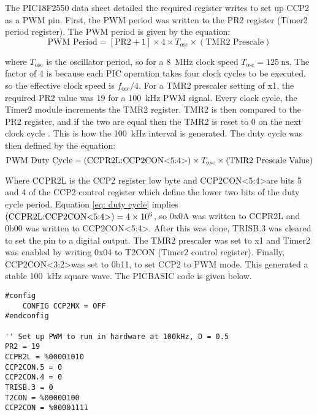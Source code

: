 The PIC18F2550 data sheet \cite{pic18f2550} detailed the required register writes to set up CCP2 as a PWM pin. First, the PWM period was written to the PR2 register (Timer2 period register). The PWM period is given by the equation:
\begin{equation}
\text{PWM Period} = [\text{PR2}+1] \times 4 \times T_\text{osc} \times (\text{TMR2 Prescale})
\end{equation}

where $T_\text{osc}$ is the oscillator period, so for a \SI{8}{\mega\hertz} clock speed $T_\text{osc}=\SI{125}{\nano\second}$. The factor of 4 is because each PIC operation takes four clock cycles to be executed, so the effective clock speed is $f_\text{osc}/4$. For a TMR2 prescaler setting of x1, the required PR2 value was 19 for a \SI{100}{\kilo\hertz} PWM signal. Every clock cycle, the Timer2 module increments the TMR2 register. TMR2 is then compared to the PR2 register, and if the two are equal then the TMR2 is reset to 0 on the next clock cycle \cite{pic18f2550}. This is how the \SI{100}{\kilo\hertz} interval is generated. The duty cycle was then defined by the equation:
\begin{equation}
\text{PWM Duty Cycle} = (\text{CCPR2L:CCP2CON\textless5:4\textgreater}) \times T_\text{osc} \times (\text{TMR2 Prescale Value}) \label{eq: duty cycle}
\end{equation}

Where CCPR2L is the CCP2 register low byte and CCP2CON\textless5:4\textgreater are bits 5 and 4 of the CCP2 control register which define the lower two bits of the duty cycle period. Equation \ref{eq: duty cycle} implies $(\text{CCPR2L:CCP2CON\textless5:4\textgreater}) = \num{4e6}$, so 0x0A was written to CCPR2L and 0b00 was written to CCP2CON\textless5:4\textgreater. After this was done, TRISB.3 was cleared to set the pin to a digital output. The TMR2 prescaler was set to x1 and Timer2 was enabled by writing 0x04 to T2CON (Timer2 control register). Finally, CCP2CON\textless3:2\textgreater was set to 0b11, to set CCP2 to PWM mode. This generated a stable \SI{100}{\kilo\hertz} square wave. The PICBASIC code is given below.\\
\begin{lstlisting}
#config
    CONFIG CCP2MX = OFF
#endconfig

'' Set up PWM to run in hardware at 100kHz, D = 0.5
PR2 = 19
CCPR2L = %00001010
CCP2CON.5 = 0
CCP2CON.4 = 0
TRISB.3 = 0
T2CON = %00000100
CCP2CON = %00001111
\end{lstlisting}




